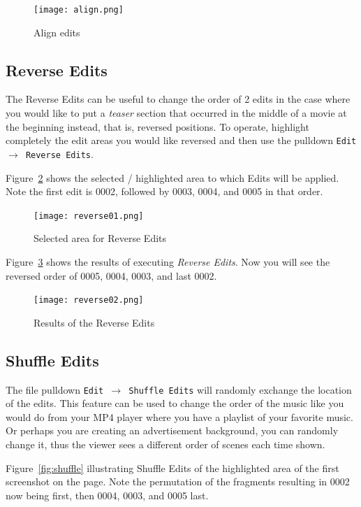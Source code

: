 \begin{figure}[htpb] \centering
  \texttt{[image: align.png]}
  \caption{Align edits}
  \label{fig:align}
\end{figure}


\subsection{Reverse Edits}%
\label{sub:reverse_edits}

The Reverse Edits can be useful to change the order of 2 edits in
the case where you would like to put a \textit{teaser} section that
occurred in the middle of a movie at the beginning instead, that is,
reversed positions.  To operate, highlight completely the edit areas
you would like reversed and then use the pulldown \texttt{Edit
  $\rightarrow$ Reverse Edits}.

Figure~\ref{fig:reverse01} shows the selected / highlighted area to
which Edits will be applied.  Note the first edit is 0002, followed
by 0003, 0004, and 0005 in that order.

\begin{figure}[htpb]
  \centering
  \texttt{[image: reverse01.png]}
  \caption{Selected area for Reverse Edits}
  \label{fig:reverse01}
\end{figure}

Figure~\ref{fig:reverse02} shows the results of executing
\textit{Reverse Edits}.  Now you will see the reversed order of
0005, 0004, 0003, and last 0002.

\begin{figure}[htpb]
  \centering
  \texttt{[image: reverse02.png]}
  \caption{Results of the Reverse Edits}
  \label{fig:reverse02}
\end{figure}


\subsection{Shuffle Edits}%
\label{sub:shuffle_edits}

The file pulldown \texttt{Edit $\rightarrow$ Shuffle Edits} will
randomly exchange the location of the edits.  This feature can be
used to change the order of the music like you would do from your
MP4 player where you have a playlist of your favorite music.  Or
perhaps you are creating an advertisement background, you can
randomly change it, thus the viewer sees a different order of scenes
each time shown.

Figure~\ref{fig:shuffle} illustrating Shuffle Edits of the
highlighted area of the first screenshot on the page.  Note the
permutation of the fragments resulting in 0002 now being first, then
0004, 0003, and 0005 last.

